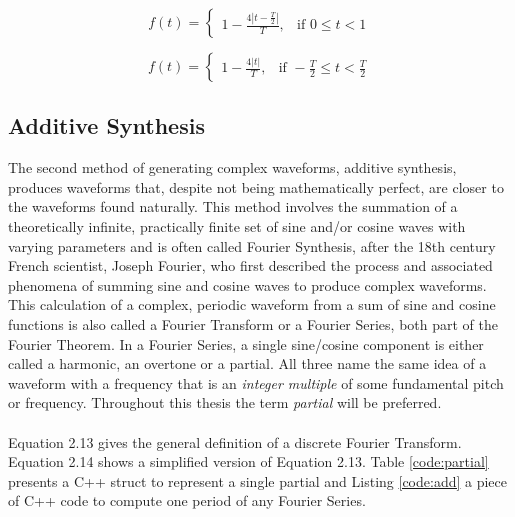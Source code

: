   \begin{multicols}{2}

    \begin{equation}
      f(t) =
      \begin{cases}
        1 - \frac{4 |t - \frac{T}{2}|}{T},& \text{if } 0 \leq t < 1
      \end{cases}
      \label{eq:dtri3}
    \end{equation}

    \begin{equation}
      f(t) =
      \begin{cases}
        1 - \frac{4 |t|}{T},& \text{if } -\frac{T}{2} \leq t < \frac{T}{2}
      \end{cases}
      \label{eq:dtri4}
    \end{equation}

  \end{multicols}

  \begin{table}
  \end{table}

  \subsection{Additive Synthesis}

  The second method of generating complex waveforms, additive synthesis, produces waveforms that, despite not being mathematically perfect, are closer to the waveforms found naturally. This method involves the summation of a theoretically infinite, practically finite set of sine and/or cosine waves with varying parameters and is often called Fourier Synthesis, after the 18th century French scientist, Joseph Fourier, who first described the process and associated phenomena of summing sine and cosine waves to produce complex waveforms. This calculation of a complex, periodic waveform from a sum of sine and cosine functions is also called a Fourier Transform or a Fourier Series, both part of the Fourier Theorem. In a Fourier Series, a single sine/cosine component is either called a harmonic, an overtone or a partial. All three name the same idea of a waveform with a frequency that is an \emph{integer multiple} of some fundamental pitch or frequency.  Throughout this thesis the term \emph{partial} will be preferred. \\\\Equation 2.13 gives the general definition of a discrete Fourier Transform. Equation 2.14 shows a simplified version of Equation 2.13. Table \ref{code:partial} presents a C++ struct to represent a single partial and Listing \ref{code:add} a piece of C++ code to compute one period of any Fourier Series.

